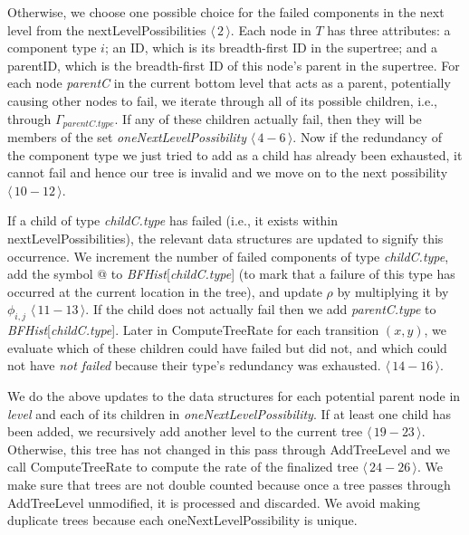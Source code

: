 \documentclass[12pt]{article}
\newcommand{\changed}[1]{#1}
\newcommand{\changed}[1]{\textcolor{red}{#1}}
\newcommand{\varName}[1]{\textrm{\it#1}}
\newcommand{\citeLine}[1]{$\langle \, #1 \, \rangle$}
\newcommand{\citeBlock}[2]{$\langle \, #1 - #2 \, \rangle$}
\begin{document}
Otherwise, we choose one possible choice for the failed components in the next level from the nextLevelPossibilities \citeLine{2}. Each node in $T$ has three attributes: \changed{a component type $i$; an ID, which is its breadth-first ID in the supertree; and a parentID, which is the breadth-first ID of this node's parent in the supertree.} For each node \varName{parentC} in the current bottom level that acts as a parent, potentially causing other nodes to fail, we iterate through all of its possible children, i.e., through $\Gamma_{parentC.type}$. If any of these children actually fail, then they will be members of the set \varName{oneNextLevelPossibility} \citeBlock{4}{6}. Now if the redundancy of the component type we just tried to add as a child has already been exhausted, it cannot fail and hence our tree is invalid and we move on to the next possibility \citeBlock{10}{12}.

If a child of type \varName{childC.type} has failed (i.e., it exists within nextLevelPossibilities), the relevant data structures are updated to signify this occurrence. We increment the number of failed components of type \varName{childC.type}, add the symbol @ to \varName{BFHist}[\varName{childC.type}] (to mark that a failure of this type has occurred at the current location in the tree), and update $\rho$ by multiplying it by $\phi_{i, j}$ \citeBlock{11}{13}. \changed{If the child does not actually fail then we add \varName{parentC.type} to \varName{BFHist}[\varName{childC.type}]. Later in ComputeTreeRate for each transition $(x, y)$, we evaluate which of these children could have failed but did not, and which could not have \textit{not failed} because their type's redundancy was exhausted.} \citeBlock{14}{16}.

We do the above updates to the data structures for each potential parent node in \varName{level} and each of its children in \varName{oneNextLevelPossibility}. If at least one child has been added, we recursively add another level to the current tree \citeBlock{19}{23}. Otherwise, this tree has not changed in this pass through \mbox{AddTreeLevel} and we call ComputeTreeRate to compute the rate of the finalized tree \citeBlock{24}{26}. We make sure that trees are not double counted because once a tree passes through \mbox{AddTreeLevel} unmodified, it is processed and discarded. We avoid making duplicate trees because each oneNextLevelPossibility is unique.
\end{document}
